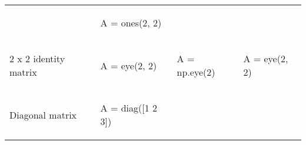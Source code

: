 \documentclass[10pt, landscape]{article}
\newenvironment{Shaded}{}{}
\newcommand{\DecValTok}[1]{\textcolor[rgb]{0.25,0.63,0.44}{{#1}}}
\newcommand{\FloatTok}[1]{\textcolor[rgb]{0.25,0.63,0.44}{{#1}}}
\newcommand{\OperatorTok}[1]{\textcolor[rgb]{0.40,0.40,0.40}{{#1}}}
\newcommand{\NormalTok}[1]{{#1}}
\begin{document}
\begin{multicols*}{2}
\begin{table}[ht]
\begin{tabular}[ ]{@{}llll@{}}
\begin{minipage}[t]{0.25\columnwidth}
\end{minipage} & \begin{minipage}[t]{0.20\columnwidth}\raggedright\strut
\begin{Shaded}
\begin{Highlighting}[]
\NormalTok{A = ones(}\FloatTok{2}\NormalTok{, }\FloatTok{2}\NormalTok{)}
\end{Highlighting}
\end{Shaded}
\strut
\end{minipage}\tabularnewline
\begin{minipage}[t]{0.24\columnwidth}\raggedright\strut
2 x 2 identity matrix\strut
\end{minipage} & \begin{minipage}[t]{0.20\columnwidth}\raggedright\strut
\begin{Shaded}
\begin{Highlighting}[]
\NormalTok{A = eye(}\FloatTok{2}\NormalTok{, }\FloatTok{2}\NormalTok{)}
\end{Highlighting}
\end{Shaded}
\strut
\end{minipage} & \begin{minipage}[t]{0.25\columnwidth}\raggedright\strut
\begin{Shaded}
\begin{Highlighting}[]
\NormalTok{A }\OperatorTok{=} \NormalTok{np.eye(}\DecValTok{2}\NormalTok{)}
\end{Highlighting}
\end{Shaded}
\strut
\end{minipage} & \begin{minipage}[t]{0.20\columnwidth}\raggedright\strut
\begin{Shaded}
\begin{Highlighting}[]
\NormalTok{A = eye(}\FloatTok{2}\NormalTok{, }\FloatTok{2}\NormalTok{)}
\end{Highlighting}
\end{Shaded}
\strut
\end{minipage}\tabularnewline
\begin{minipage}[t]{0.24\columnwidth}\raggedright\strut
Diagonal matrix\strut
\end{minipage} & \begin{minipage}[t]{0.20\columnwidth}\raggedright\strut
\begin{Shaded}
\begin{Highlighting}[]
\NormalTok{A = diag([}\FloatTok{1} \FloatTok{2} \FloatTok{3}\NormalTok{])}
\end{Highlighting}

\end{Shaded}
\end{minipage}
\end{tabular}
\end{table}
\end{multicols*}
\end{document}
